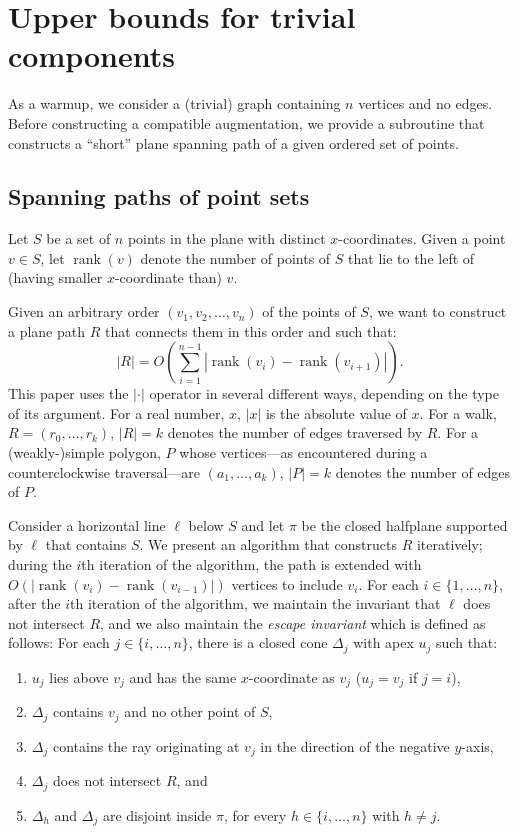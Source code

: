 \documentclass[11pt]{patmorin}
\DeclareMathOperator{\rank}{rank}
\begin{document}
\section{Upper bounds for trivial components}\label{section:Trivial components}
As a warmup, we consider a (trivial) graph containing $n$ vertices and no edges.
Before constructing a compatible augmentation, we provide a subroutine
that constructs a ``short'' plane spanning path of a given ordered set of points.

\subsection{Spanning paths of point sets}
Let $S$ be a set of $n$ points in the plane with distinct $x$-coordinates. 
Given a point $v\in S$, let $\rank(v)$ denote the number of points of $S$ that lie to the left of (having smaller $x$-coordinate than) $v$.

Given an arbitrary order $(v_1, v_2, \ldots, v_n)$ of the points of $S$, we want to construct a plane path $R$ that connects them in this order and such that:  
\[
   |R|  = O\left(\sum_{i=1}^{n-1} |\rank(v_i) - \rank(v_{i+1})| \right).
\]
This paper uses the $|\cdot|$ operator in several different ways, depending on the type of its argument.  For a real number, $x$, $|x|$ is the absolute value of $x$.  For a walk, $R=(r_0,\ldots,r_k)$, $|R|=k$ denotes the number of edges traversed by $R$. For a (weakly-)simple polygon, $P$ whose vertices---as encountered during a counterclockwise traversal---are $(a_1,\ldots,a_k)$, $|P|=k$ denotes the number of edges of $P$.

Consider a horizontal line $\ell$ below $S$ and let $\pi$ be the closed halfplane supported by $\ell$ that contains $S$.  We present an algorithm that constructs $R$ iteratively; during the $i$th iteration of the algorithm, the path is extended with $O(|\rank(v_i) - \rank(v_{i-1})|)$ vertices to include $v_i$.  For each $i\in \{1,\dots,n\}$, after the $i$th iteration of the algorithm, we maintain the invariant that $\ell$ does not intersect $R$, and we also maintain the \emph{escape invariant} which is defined as follows:
For each $j\in \{i, \dots, n\}$, there is a closed cone $\Delta_{j}$ with apex $u_{j}$ such that:
\begin{enumerate} 
\item $u_j$ lies above $v_j$ and has the same $x$-coordinate as $v_j$ ($u_j =v_j$ if $j = i$), 
\item $\Delta_j$ contains $v_j$ and no other point of $S$, 
\item $\Delta_j$ contains the ray originating at $v_j$ in the direction of the negative $y$-axis, 
\item $\Delta_j$ does not intersect $R$, and 
\item $\Delta_h$ and $\Delta_j$ are disjoint inside $\pi$, for every $h\in \{i,\dots,n\}$ with $h\neq j$.
\end{enumerate}
\end{document}
